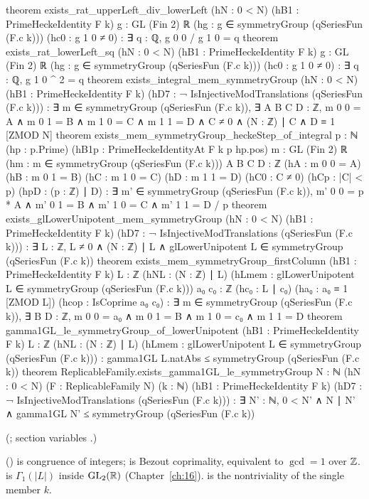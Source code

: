 \begin{leancode}
theorem exists_rat_upperLeft_div_lowerLeft (hN : 0 < N) (hB1 : PrimeHeckeIdentity F k)
    {g : GL (Fin 2) ℝ} (hg : g ∈ symmetryGroup (qSeriesFun (F.c k))) (hc0 : g 1 0 ≠ 0) :
    ∃ q : ℚ, g 0 0 / g 1 0 = q
theorem exists_rat_lowerLeft_sq (hN : 0 < N) (hB1 : PrimeHeckeIdentity F k)
    {g : GL (Fin 2) ℝ} (hg : g ∈ symmetryGroup (qSeriesFun (F.c k))) (hc0 : g 1 0 ≠ 0) :
    ∃ q : ℚ, g 1 0 ^ 2 = q
theorem exists_integral_mem_symmetryGroup (hN : 0 < N) (hB1 : PrimeHeckeIdentity F k)
    (hD7 : ¬ IsInjectiveModTranslations (qSeriesFun (F.c k))) :
    ∃ m ∈ symmetryGroup (qSeriesFun (F.c k)), ∃ A B C D : ℤ, m 0 0 = A ∧ m 0 1 = B ∧
      m 1 0 = C ∧ m 1 1 = D ∧ C ≠ 0 ∧ (N : ℤ) ∣ C ∧ D ≡ 1 [ZMOD N]
theorem exists_mem_symmetryGroup_heckeStep_of_integral {p : ℕ} (hp : p.Prime)
    (hB1p : PrimeHeckeIdentityAt F k p hp.pos) {m : GL (Fin 2) ℝ}
    (hm : m ∈ symmetryGroup (qSeriesFun (F.c k))) {A B C D : ℤ} (hA : m 0 0 = A)
    (hB : m 0 1 = B) (hC : m 1 0 = C) (hD : m 1 1 = D) (hC0 : C ≠ 0) (hCp : |C| < p)
    (hpD : (p : ℤ) ∣ D) :
    ∃ m' ∈ symmetryGroup (qSeriesFun (F.c k)), m' 0 0 = p * A ∧ m' 0 1 = B ∧ m' 1 0 = C ∧
      m' 1 1 = D / p
theorem exists_glLowerUnipotent_mem_symmetryGroup (hN : 0 < N) (hB1 : PrimeHeckeIdentity F k)
    (hD7 : ¬ IsInjectiveModTranslations (qSeriesFun (F.c k))) :
    ∃ L : ℤ, L ≠ 0 ∧ (N : ℤ) ∣ L ∧ glLowerUnipotent L ∈ symmetryGroup (qSeriesFun (F.c k))
theorem exists_mem_symmetryGroup_firstColumn (hB1 : PrimeHeckeIdentity F k)
    {L : ℤ} (hNL : (N : ℤ) ∣ L)
    (hLmem : glLowerUnipotent L ∈ symmetryGroup (qSeriesFun (F.c k))) {a₀ c₀ : ℤ}
    (hc₀ : L ∣ c₀) (ha₀ : a₀ ≡ 1 [ZMOD L]) (hcop : IsCoprime a₀ c₀) :
    ∃ m ∈ symmetryGroup (qSeriesFun (F.c k)), ∃ B D : ℤ, m 0 0 = a₀ ∧ m 0 1 = B ∧
      m 1 0 = c₀ ∧ m 1 1 = D
theorem gamma1GL_le_symmetryGroup_of_lowerUnipotent (hB1 : PrimeHeckeIdentity F k)
    {L : ℤ} (hNL : (N : ℤ) ∣ L)
    (hLmem : glLowerUnipotent L ∈ symmetryGroup (qSeriesFun (F.c k))) :
    gamma1GL L.natAbs ≤ symmetryGroup (qSeriesFun (F.c k))
theorem ReplicableFamily.exists_gamma1GL_le_symmetryGroup {N : ℕ} (hN : 0 < N)
    (F : ReplicableFamily N) (k : ℕ) (hB1 : PrimeHeckeIdentity F k)
    (hD7 : ¬ IsInjectiveModTranslations (qSeriesFun (F.c k))) :
    ∃ N' : ℕ, 0 < N' ∧ N ∣ N' ∧ gamma1GL N' ≤ symmetryGroup (qSeriesFun (F.c k))
\end{leancode}
(; section variables .)
\begin{dictionary}
 () is congruence of integers;  is Bezout coprimality, equivalent to
$\gcd=1$ over ${\mathbb{Z}}$.   is $\Gamma_1(|L|)$ inside $\mathrm{GL}_2(\mathbb{R})$ (Chapter~\ref{ch:16}).   is the
nontriviality of the single member $k$.
\end{dictionary}
